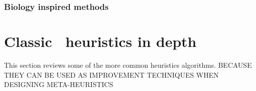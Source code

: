 
\subsubsection{Biology inspired methods}




\section{Classic \VRP\ heuristics in depth}
\label{sec:cvhid}

This section reviews some of the more common heuristics algorithms. BECAUSE THEY CAN BE USED AS IMPROVEMENT TECHNIQUES WHEN DESIGNING META-HEURISTICS


